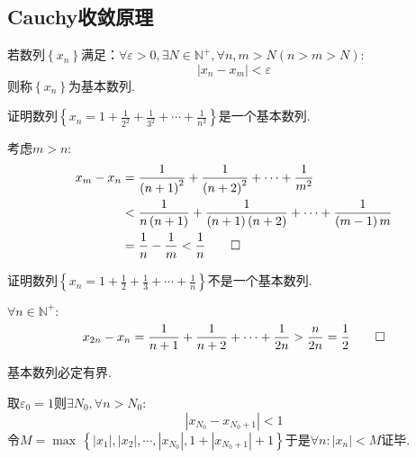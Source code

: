 \subsection{Cauchy收敛原理}
\begin{formal}
    \begin{definition}[基本数列的定义]\label{def:基本数列的定义}
        若数列$\left\{x_n\right\}$满足：$\forall \varepsilon>0,\exists N\in\mathbb{N}^+,\forall n,m>N\left(n>m>N\right):$\[
        \left|x_n-x_m\right|<\varepsilon
        \]则称$\left\{x_n\right\}$为基本数列.
    \end{definition}
\end{formal}
\begin{brown}
    \begin{example}
        证明数列$\displaystyle\left\{x_n=1+\frac{1}{2^2}+\frac{1}{3^2}+\cdots+\frac{1}{n^2}\right\}$是一个基本数列.
    \end{example}
    \begin{Proof}
        考虑$m>n$:\begin{align*}
            x_m-x_n&=\frac{1}{\left(n+1\right)^2}+\frac{1}{\left(n+2\right)^2}+\cdots+\frac{1}{m^2}\\
            &<\frac{1}{n\left(n+1\right)}+\frac{1}{\left(n+1\right)\left(n+2\right)}+\cdots+\frac{1}{\left(m-1\right)m}\\
            &=\frac{1}{n}-\frac{1}{m}<\frac{1}{n}\qedhere
        \end{align*}
    \end{Proof}
\end{brown}
\begin{brown}
    \begin{example}
        证明数列$\displaystyle\left\{x_n=1+\frac{1}{2}+\frac{1}{3}+\cdots+\frac{1}{n}\right\}$不是一个基本数列.
    \end{example}
    \begin{Proof}
        $\forall n\in\mathbb{N}^+:$\[
        x_{2n}-x_n=\frac{1}{n+1}+\frac{1}{n+2}+\cdots+\frac{1}{2n}>\frac{n}{2n}=\frac{1}{2}\qedhere
        \]
    \end{Proof}
\end{brown}
\begin{green}
    \begin{lemma}[基本数列有界]\label{lem:基本数列有界}
        基本数列必定有界.
    \end{lemma}
    \begin{Proof}
        取$\varepsilon_0=1$则$\exists N_0,\forall n>N_0:$\[
        \left|
            x_{N_0}-x_{N_0+1}
        \right|<1
        \]令$M=\max\,\left\{
            \left|x_1\right|,\left|x_2\right|,\cdots,\left|x_{N_0}\right|,1+\left|x_{N_0+1}\right|+1
        \right\}$于是$\forall n:\left|x_n\right|<M$证毕.
    \end{Proof}
\end{green}
